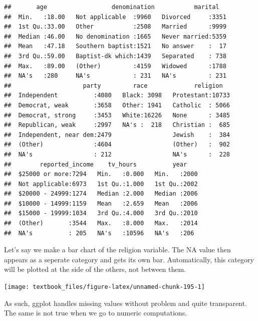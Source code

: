 \documentclass[]{tufte-book}
\newenvironment{Shaded}{}{}
\newcommand{\KeywordTok}[1]{\textcolor[rgb]{0.00,0.44,0.13}{\textbf{#1}}}
\newcommand{\NormalTok}[1]{#1}
\newcommand{\OperatorTok}[1]{\textcolor[rgb]{0.40,0.40,0.40}{#1}}
\newcommand{\StringTok}[1]{\textcolor[rgb]{0.25,0.44,0.63}{#1}}
\begin{document}
\begin{verbatim}
##       age                  denomination           marital    
##  Min.   :18.00   Not applicable  :9960   Divorced     :3351  
##  1st Qu.:33.00   Other           :2508   Married      :9999  
##  Median :46.00   No denomination :1665   Never married:5359  
##  Mean   :47.18   Southern baptist:1521   No answer    :  17  
##  3rd Qu.:59.00   Baptist-dk which:1439   Separated    : 738  
##  Max.   :89.00   (Other)         :4159   Widowed      :1788  
##  NA's   :280     NA's            : 231   NA's         : 231  
##                    party         race             religion    
##  Independent          :4080   Black: 3098   Protestant:10733  
##  Democrat, weak       :3658   Other: 1941   Catholic  : 5066  
##  Democrat, strong     :3453   White:16226   None      : 3485  
##  Republican, weak     :2997   NA's :  218   Christian :  685  
##  Independent, near dem:2479                 Jewish    :  384  
##  (Other)              :4604                 (Other)   :  902  
##  NA's                 : 212                 NA's      :  228  
##        reported_income    tv_hours          year     
##  $25000 or more:7294   Min.   :0.000   Min.   :2000  
##  Not applicable:6973   1st Qu.:1.000   1st Qu.:2002  
##  $20000 - 24999:1274   Median :2.000   Median :2006  
##  $10000 - 14999:1159   Mean   :2.659   Mean   :2006  
##  $15000 - 19999:1034   3rd Qu.:4.000   3rd Qu.:2010  
##  (Other)       :3544   Max.   :8.000   Max.   :2014  
##  NA's          : 205   NA's   :10596   NA's   :206
\end{verbatim}

Let's say we make a bar chart of the religion variable. The NA value then appears as a seperate category and gets its own bar. Automatically, this category will be plotted at the side of the others, not between them.

\begin{Shaded}
\end{Shaded}

\texttt{[image: textbook\_files/figure-latex/unnamed-chunk-195-1]}

As such, ggplot handles missing values without problem and quite transparent. The same is not true when we go to numeric computations.
\end{document}
